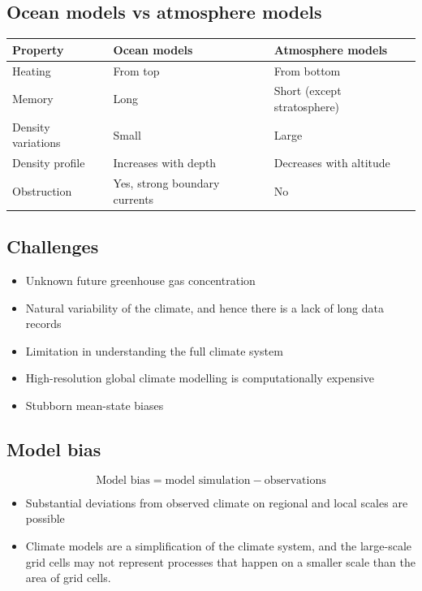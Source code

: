 \documentclass[11pt]{article}
\begin{document}
\subsection{Ocean models vs atmosphere models}
\label{sec:orgf03293f}
\begin{center}
\begin{tabular}{lll}
\textbf{Property} & \textbf{Ocean models} & \textbf{Atmosphere models}\\
\hline
Heating & From top & From bottom\\
Memory & Long & Short (except stratosphere)\\
Density variations & Small & Large\\
Density profile & Increases with depth & Decreases with altitude\\
Obstruction & Yes, strong boundary currents & No\\
\end{tabular}
\end{center}

\newpage
\subsection{Challenges}
\label{sec:org7178106}
\begin{itemize}
\item Unknown future greenhouse gas concentration
\item Natural variability of the climate, and hence there is a lack of long data records
\item Limitation in understanding the full climate system
\item High-resolution global climate modelling is computationally expensive
\item Stubborn mean-state biases
\end{itemize}
\subsection{Model bias}
\label{sec:orge20a966}
\[\text{Model bias} = \text{model simulation} - \text{observations}\]

\begin{itemize}
\item Substantial deviations from observed climate on regional and local scales are possible
\item Climate models are a simplification of the climate system, and the large-scale grid cells may not represent processes that happen on a smaller scale than the area of grid cells.
\end{itemize}
\end{document}
